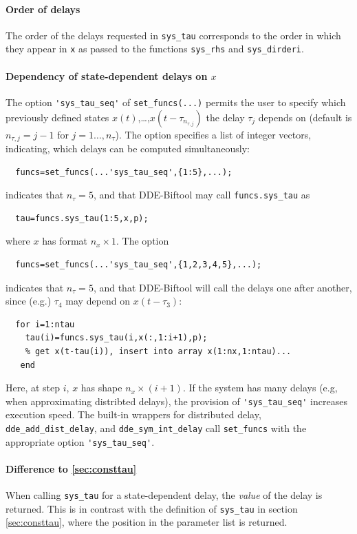 \documentclass[10pt]{scrartcl}
\newcommand{\blist}[1]{\mbox{\lstinline!#1!}}
\begin{document}
\paragraph{Order of delays} The order of the delays
requested in \blist{sys_tau} corresponds to the order in which they
appear in \blist{x} as passed to the functions \blist{sys_rhs} and
\blist{sys_dirderi}.

\paragraph{Dependency of  state-dependent delays on $x$}
The option \blist{'sys_tau_seq'} of
\blist{set_funcs(...)} permits the user to specify which previously
defined states $x(t)$,\ldots,$x(t-\tau_{n_{\tau,j}})$ the delay $\tau_j$ depends on (default is $n_{\tau,j}=j-1$ for
$j=1\ldots,n_\tau$). The option specifies a list of integer vectors, indicating, which delays can be computed simultaneously:
\begin{lstlisting}
  funcs=set_funcs(...'sys_tau_seq',{1:5},...);
\end{lstlisting}
indicates that $n_\tau=5$, and that DDE-Biftool may call \blist{funcs.sys_tau} as
\begin{lstlisting}
  tau=funcs.sys_tau(1:5,x,p);
\end{lstlisting}
where $x$ has format $n_x\times1$. The option
\begin{lstlisting}
  funcs=set_funcs(...'sys_tau_seq',{1,2,3,4,5},...);
\end{lstlisting}
indicates that $n_\tau=5$, and that DDE-Biftool will call the delays one after another, since (e.g.) $\tau_4$ may depend on $x(t-\tau_3)$:
\begin{lstlisting}
  for i=1:ntau
    tau(i)=funcs.sys_tau(i,x(:,1:i+1),p);
    % get x(t-tau(i)), insert into array x(1:nx,1:ntau)...
   end
\end{lstlisting}
Here, at step $i$, $x$ has shape $n_x\times(i+1)$. If the system has
many delays (e.g, when approximating distribted delays), the provision
of \blist{'sys_tau_seq'} increases execution speed. The built-in
wrappers for distributed delay, \blist{dde_add_dist_delay}, and
\blist{dde_sym_int_delay} call \blist{set_funcs} with the appropriate
option \blist{'sys_tau_seq'}.


\paragraph{Difference to \cref{sec:consttau}} When calling
  \blist{sys_tau} for a state-dependent delay, the \emph{value} of the delay is
  returned.  This is in contrast with the definition of \blist{sys_tau}
  in section \ref{sec:consttau}, where the position in the parameter list
  is returned.
\end{document}
